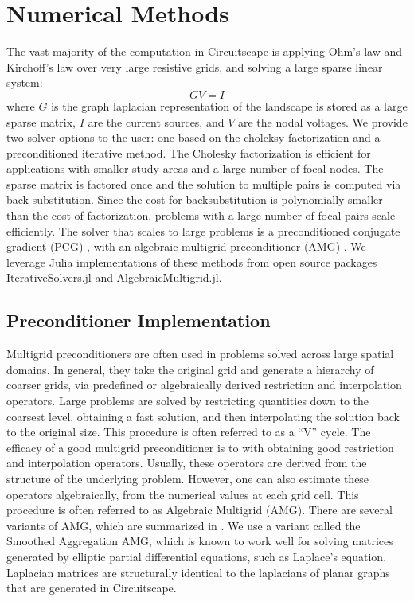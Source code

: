 \documentclass{juliacon}
\begin{document}
\section{Numerical Methods}
The vast majority of the computation in Circuitscape is applying Ohm’s law and Kirchoff’s law over very large resistive grids, and solving a large sparse linear system: 
$$
GV = I
$$
where $G$ is the graph laplacian representation of the landscape is stored as a large sparse matrix, $I$ are the current sources, and $V$ are the nodal voltages. We provide two solver options to the user: one based on the choleksy factorization and a preconditioned iterative method. The Cholesky factorization \cite{higham2009cholesky} is efficient for applications with smaller study areas and a large number of focal nodes. The sparse matrix is factored once and the solution to multiple pairs is computed via back substitution. Since the cost for backsubstitution is polynomially smaller than the cost of factorization, problems with a large number of focal pairs scale efficiently. The solver that scales to large problems is a preconditioned conjugate gradient (PCG) \cite{trefethen1997numerical}, with an algebraic multigrid preconditioner (AMG) \cite{vanvek1996algebraic}. We leverage Julia implementations of these methods from open source packages IterativeSolvers.jl and AlgebraicMultigrid.jl.

\subsection{Preconditioner Implementation}
Multigrid preconditioners are often used in problems solved across large spatial domains. In general, they take the original grid and generate a hierarchy of coarser grids, via predefined or algebraically derived restriction and interpolation operators. Large problems are solved by restricting quantities down to the coarsest level, obtaining a fast solution, and then interpolating the solution back to the original size. This procedure is often referred to as a “V” cycle. The efficacy of a good multigrid preconditioner is to with obtaining good restriction and interpolation operators. Usually, these operators are derived from the structure of the underlying problem. However, one can also estimate these operators algebraically, from the numerical values at each grid cell. This procedure is often referred to as Algebraic Multigrid (AMG). There are several variants of AMG, which are summarized in \cite{stuben2001review}. We use a variant called the Smoothed Aggregation AMG, which is known to work well for solving matrices generated by elliptic partial differential equations, such as Laplace’s equation. Laplacian matrices are structurally identical to the laplacians of planar graphs that are generated in Circuitscape.
\end{document}
